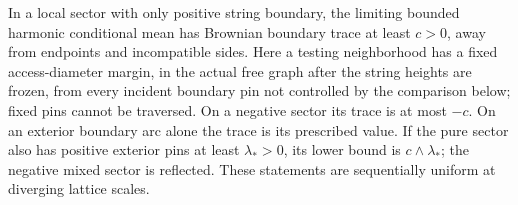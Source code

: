 \begin{lemma}\label{g:sign-trace}
In a local sector with only positive string boundary, the limiting bounded
harmonic conditional mean has Brownian boundary trace at least \(c>0\),
away from endpoints and incompatible sides. Here a testing neighborhood
has a fixed access-diameter margin, in the actual free graph after the
string heights are frozen, from every incident boundary pin not controlled
by the comparison below; fixed pins cannot be traversed. On a negative sector its
trace is at most \(-c\). On an exterior boundary arc alone the trace is
its prescribed value. If the pure sector also has positive exterior pins
at least $\lambda_*>0$, its lower bound is $c\wedge\lambda_*$; the
negative mixed sector is reflected. These statements are sequentially uniform at
diverging lattice scales.
\end{lemma}

